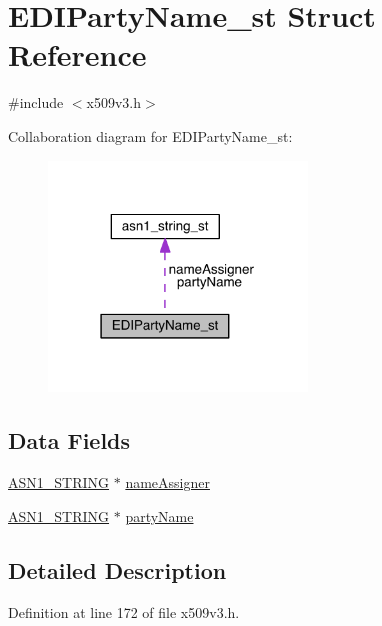\hypertarget{struct_e_d_i_party_name__st}{}\section{E\+D\+I\+Party\+Name\+\_\+st Struct Reference}
\label{struct_e_d_i_party_name__st}


{\ttfamily \#include $<$x509v3.\+h$>$}



Collaboration diagram for E\+D\+I\+Party\+Name\+\_\+st\+:\nopagebreak
\begin{figure}[H]
\begin{center}
\leavevmode
\includegraphics[width=195pt]{struct_e_d_i_party_name__st__coll__graph}
\end{center}
\end{figure}
\subsection*{Data Fields}
\begin{DoxyCompactItemize}
\item 
\hyperlink{crypto_2ossl__typ_8h_ad37610875e38aa6c59f5e6e0b437e65c}{A\+S\+N1\+\_\+\+S\+T\+R\+I\+NG} $\ast$ \hyperlink{struct_e_d_i_party_name__st_a21e63dff6ae89543736f5e5175a2dfed}{name\+Assigner}
\item 
\hyperlink{crypto_2ossl__typ_8h_ad37610875e38aa6c59f5e6e0b437e65c}{A\+S\+N1\+\_\+\+S\+T\+R\+I\+NG} $\ast$ \hyperlink{struct_e_d_i_party_name__st_a4b8db6494ccd6fd7619c6bbdb659a62a}{party\+Name}
\end{DoxyCompactItemize}


\subsection{Detailed Description}


Definition at line 172 of file x509v3.\+h.



